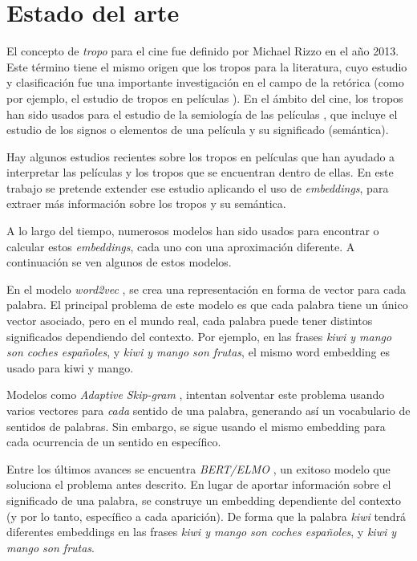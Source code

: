 \chapter{Estado del arte}

El concepto de \emph{tropo} para el cine fue definido por Michael Rizzo \cite{rizzo2013art} en el año 2013. Este término
tiene el mismo origen que los tropos para la literatura, cuyo estudio y clasificación fue una importante investigación en el
campo de la retórica (como por ejemplo, el estudio de tropos en películas \cite{nelson1998tropes}). En el ámbito del cine,
los tropos han sido usados para el estudio de la semiología de las películas \cite{howtoreadafilm}, que incluye el estudio
de los signos o elementos de una película y su significado (semántica).

Hay algunos estudios recientes sobre los tropos en películas \cite{garcia2018overview} que han ayudado a interpretar las
películas y los tropos que se encuentran dentro de ellas. En este trabajo se pretende extender ese estudio aplicando el uso
de \emph{embeddings}, para extraer más información sobre los tropos y su semántica.

A lo largo del tiempo, numerosos modelos han sido usados para encontrar o calcular estos \textit{embeddings}, cada uno
con una aproximación diferente. A continuación se ven algunos de estos modelos.

En el modelo \emph{word2vec} \cite{word2vec:1} \cite{word2vec:2}, se crea una representación
en forma de vector para cada palabra. El principal problema de este modelo es que cada palabra tiene un único vector asociado,
pero en el mundo real, cada palabra puede tener distintos significados dependiendo del contexto.
Por ejemplo, en las frases \emph{kiwi y mango son coches españoles}, y \emph{kiwi y mango son frutas},
el mismo word embedding es usado para kiwi y mango.

Modelos como \emph{Adaptive Skip-gram} \cite{adaptiveskipgram}, intentan solventar este problema usando
varios vectores para \emph{cada} sentido de una palabra, generando así un vocabulario de sentidos de palabras.
Sin embargo, se sigue usando el mismo embedding para cada ocurrencia de un sentido en específico.

Entre los últimos avances se encuentra \emph{BERT/ELMO} \cite{bert}, un exitoso modelo que soluciona el
problema antes descrito. En lugar de aportar información sobre el significado de una palabra, se construye
un embedding dependiente del contexto (y por lo tanto, específico a cada aparición). De forma que la palabra
\emph{kiwi} tendrá diferentes embeddings en las frases \emph{kiwi y mango son coches españoles}, y
\emph{kiwi y mango son frutas}.

